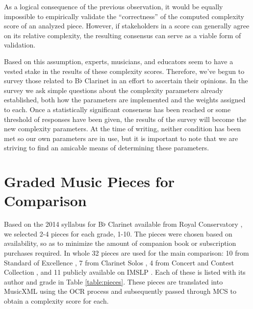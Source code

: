 \documentclass[12pt]{report}
\begin{document}
As a logical consequence of the previous observation, it would be equally impossible to empirically validate the ``correctness'' of the computed complexity score of an analyzed piece. However, if stakeholders in a score can generally agree on its relative complexity, the resulting consensus can serve as a viable form of validation.

Based on this assumption, experts, musicians, and educators seem to have a vested stake in the results of these complexity scores. Therefore, we've begun to survey those related to B$\flat$ Clarinet in an effort to ascertain their opinions. In the survey we ask simple questions about the complexity parameters already established, both how the parameters are implemented and the weights assigned to each. Once a statistically significant consensus has been reached or some threshold of responses have been given, the results of the survey will become the new complexity parameters. At the time of writing, neither condition has been met so our own parameters are in use, but it is important to note that we are striving to find an amicable means of determining these parameters.

\section{Graded Music Pieces for Comparison}
\label{sec:pieces}

Based on the 2014 syllabus for B$\flat$ Clarinet available from Royal Conservatory \cite{RoyalSyllabus}, we selected 2-4 pieces for each grade, 1-10. The pieces were chosen based on availability, so as to minimize the amount of companion book or subscription purchases required. In whole 32 pieces are used for the main comparison: 10 from Standard of Excellence \cite{Standard}, 7 from Clarinet Solos \cite{Solos}, 4 from Concert and Contest Collection \cite{Concert}, and 11 publicly available on IMSLP \cite{IMSLP}. Each of these is listed with its author and grade in Table \ref{table:pieces}. These pieces are translated into MusicXML using the OCR process and subsequently passed through MCS to obtain a complexity score for each.
\end{document}
